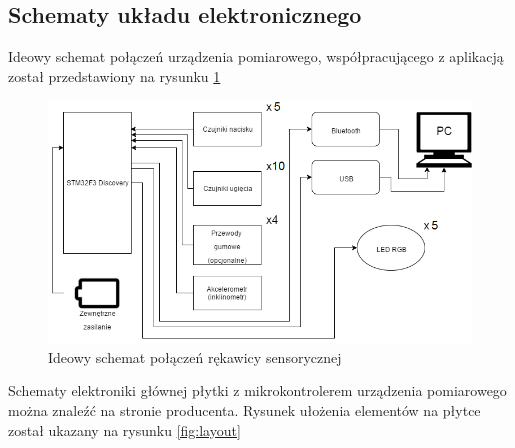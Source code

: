 \documentclass[12pt,a4paper]{article}
\begin{document}
\subsection{Schematy układu elektronicznego}
Ideowy schemat połączeń urządzenia pomiarowego, współpracującego z aplikacją został przedstawiony na rysunku \ref{fig:ideascheme}
\begin{figure}[!htb]
\centering
\includegraphics[width=\textwidth]{./SchematIdeowy.png}
\caption{Ideowy schemat połączeń rękawicy sensorycznej\label{fig:ideascheme}}
\end{figure}
Schematy elektroniki głównej płytki z mikrokontrolerem urządzenia pomiarowego można znaleźć na stronie producenta. Rysunek ułożenia elementów na płytce został ukazany na rysunku \ref{fig:layout}
\end{document}
